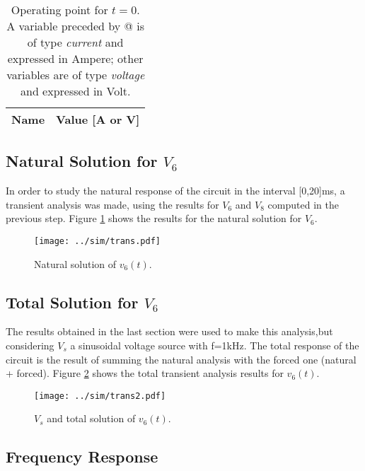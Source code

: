 \begin{table}[h]
  \centering
  \begin{tabular}{|l|r|}
    \hline    
    {\bf Name} & {\bf Value [A or V]} \\ \hline
    
  \end{tabular}
  \caption{Operating point for $t=0$. A variable preceded by @ is of type {\em current}
    and expressed in Ampere; other variables are of type {\it voltage} and expressed in
    Volt.}
  \label{tab:SIM_PASSO2}
\end{table}

\subsection{Natural Solution for $V_6$}

In order to study the natural response of the circuit in the interval [0,20]ms, a transient analysis was made, using the results for $V_6$ and $V_8$ computed in the previous step. Figure \ref{fig:SIM_NAT_SOL} shows the results for the natural solution for $V_6$.

\begin{figure}[h] \centering
\vspace{-3cm}
\texttt{[image: ../sim/trans.pdf]}
\caption{Natural solution of $v_6(t)$.}
\label{fig:SIM_NAT_SOL}
\end{figure}

\newpage
\subsection{Total Solution for $V_6$}

The results obtained in the last section were used to make this analysis,but considering $V_s$ a sinusoidal voltage source with f=1kHz. The total response of the circuit is the result of summing the natural analysis with the forced one (natural + forced). 
Figure \ref{fig:SIM_TOT_SOL} shows the total transient analysis results for $v_6(t)$.

\begin{figure}[h] \centering
\texttt{[image: ../sim/trans2.pdf]}
\caption{$V_s$ and total solution of $v_6(t)$.}
\label{fig:SIM_TOT_SOL}
\end{figure}

\newpage
\subsection{Frequency Response}


